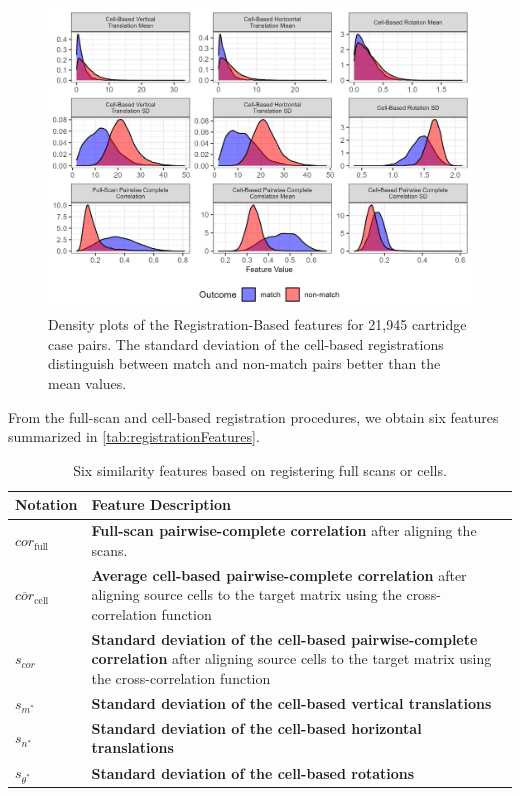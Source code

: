 \documentclass[
]{jdssv}
\begin{document}
\begin{CodeChunk}
\begin{figure}[htbp]

{\centering \includegraphics[width=\textwidth]{images/registrationFeatureDensities} 

}

\caption{\label{fig:registrationDensities} Density plots of the Registration-Based features for 21,945 cartridge case pairs. The standard deviation of the cell-based registrations distinguish between match and non-match pairs better than the mean values.}\label{fig:unnamed-chunk-11}
\end{figure}
\end{CodeChunk}

From the full-scan and cell-based registration procedures, we obtain six
features summarized in \autoref{tab:registrationFeatures}.

\begin{table}[htbp]
\centering
\begin{tabular}{|p{.11\linewidth}|p{.7\linewidth}|}
\hline
Notation & Feature Description \\
\hline
$cor_{\text{full}}$ & \textbf{Full-scan pairwise-complete correlation} after aligning the scans. \\
\hline
$\overline{cor}_{\text{cell}}$ & \textbf{Average cell-based pairwise-complete correlation} after aligning source cells to the target matrix using the cross-correlation function \\
\hline
$s_{cor}$ & \textbf{Standard deviation of the cell-based pairwise-complete correlation} after aligning source cells to the target matrix using the cross-correlation function \\
\hline
$s_{m^*}$ & \textbf{Standard deviation of the cell-based vertical translations} \\
\hline
$s_{n^*}$ & \textbf{Standard deviation of the cell-based horizontal translations} \\
\hline
$s_{\theta^*}$ & \textbf{Standard deviation of the cell-based rotations} \\
\hline
\end{tabular}
\caption{Six similarity features based on registering full scans or cells.}
\label{tab:registrationFeatures}
\end{table}
\end{document}

